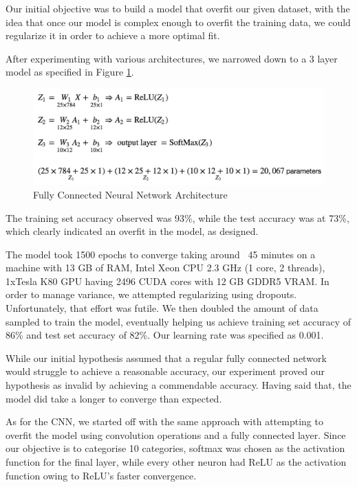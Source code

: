 \documentclass[12pt]{article}
\begin{document}
Our initial objective was to build a model that overfit our given dataset,
with the idea that once our model is complex enough to overfit the training
data, we could regularize it in order to achieve a more optimal fit.

After experimenting with various architectures, we narrowed down to a 3 layer
model as specified in Figure \ref{fig:fcnn}.

\begin{figure}[h]
  \begin{center}
    \includegraphics[scale=0.75]{fig2}
    \end{center}
  \caption{Fully Connected Neural Network Architecture}
  \label{fig:fcnn}
  \end{figure}

The training set accuracy observed was 93\%, while the test accuracy was at
73\%, which clearly indicated an overfit in the model, as designed.

The model took 1500 epochs to converge taking around ~45 minutes on a
machine with 13 GB of RAM, Intel Xeon CPU 2.3 GHz (1 core, 2 threads),
1xTesla K80 GPU having 2496 CUDA cores with 12 GB GDDR5 VRAM. In order to
manage variance, we attempted regularizing using dropouts. Unfortunately,
that effort was futile. We then doubled the amount of data sampled to train
the model, eventually helping us achieve training set accuracy of 86\% and
test set accuracy of 82\%. Our learning rate was specified as 0.001.

While our initial hypothesis assumed that a regular fully connected network
would struggle to achieve a reasonable accuracy, our experiment proved our
hypothesis as invalid by achieving a commendable accuracy. Having said that,
the model did take a longer to converge than expected.

As for the CNN, we started off with the same approach with attempting to
overfit the model using convolution operations and a fully connected layer.
Since our objective is to categorise 10 categories, softmax was chosen as the
activation function for the final layer, while every other neuron had ReLU as
the activation function owing to ReLU’s faster convergence.
\end{document}
